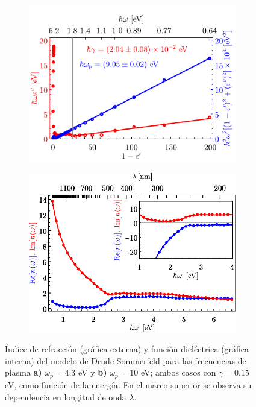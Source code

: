 	\begin{figure}[t!]\centering\hspace*{-1.5em}
	\begin{subfigure}{.01\linewidth}\caption{}\label{sfig:Drude4eV}\vspace{3.75cm}\end{subfigure}
	\begin{subfigure}{.45\linewidth}\hspace*{-1.3em}
	\includegraphics[scale=1]{1-Teoria/figs/1-4-DrudeFit_Ag.pdf}
	\end{subfigure}
	\begin{subfigure}{.01\linewidth}\caption{}\label{sfig:Drude10eV}\vspace{3.75cm}\end{subfigure}
	\begin{subfigure}{.45\linewidth}\hspace*{-1em}
	\includegraphics[scale=.6]{1-Teoria/figs/1-4-varepsn_JC_Au.pdf}
	\end{subfigure}\vspace*{-.7em}
	\caption{ Índice de refracción (gráfica externa) y función dieléctrica (gráfica interna) del modelo de Drude-Sommerfeld para las frecuencias de plasma \textbf{a)} $\omega_p=4. 3$ eV y \textbf{b)} $\omega_p=10$ eV; ambos casos con $\gamma=0. 15$ eV, como función de la energía.  En el marco superior se observa su dependencia en longitud de onda $\lambda$. }\label{fig:Drude}
	\end{figure}	
